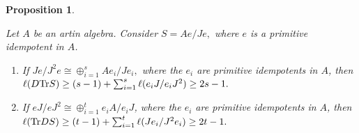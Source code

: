 \documentclass[10pt]{amsart}
\newtheorem{Prop}[Theo]{Proposition}
\theoremstyle{definition}
\begin{document}
\begin{Prop}\label{S_ART_length} 

Let $A$ be an artin algebra. Consider $S=Ae/Je,$ where $e$ is a primitive idempotent in $A$.

\begin{enumerate}[$(1)$]

\vspace{-1.2pt}

\item If $Je/J^2e\cong \oplus_{i=1}^s Ae_i/Je_i,$ \vspace{1.3pt} where the $e_i$ are primitive idempotents in $A$, then $\ell(D{\rm Tr}S) \ge (s-1)+\sum_{i=1}^s \ell(e_iJ/e_iJ^2)\ge 2s-1.$

\vspace{1.5pt}

\item If $eJ/eJ^2 \cong \oplus_{i=1}^t e_iA/e_iJ$, \vspace{1.3pt} where the $e_i$ are primitive idempotents in $A$, then $\ell({\rm Tr}D S) \ge (t-1) + \sum_{i=1}^t\ell(Je_i/J^2e_i)\ge 2t-1.$

\end{enumerate}\end{Prop}
\end{document}
